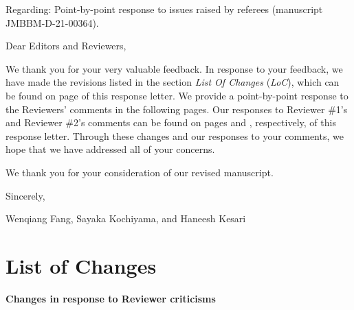 \documentclass[11pt,letterpaper]{report}
\begin{document}
\newpage
\setcounter{page}{1}
\thispagestyle{fancy}
\phantom{x}
\vspace{4em}

Regarding: Point-by-point response to issues raised by referees  (manuscript JMBBM-D-21-00364).

\vspace{3em}
Dear Editors and Reviewers,
\vspace{1em}

We thank you for your very valuable feedback. In response to your feedback, we have made the revisions listed in the section \textit{List Of Changes} (\textit{LoC}), which can be found on  page \pageref{LoCpage} of this response letter. We  provide a point-by-point response to the Reviewers' comments in the following pages. Our responses to Reviewer \#1's and Reviewer \#2's comments can be found on pages \pageref{rev1} and \pageref{rev2}, respectively, of this response letter. Through these changes and our responses to your comments, we hope that we have addressed all of your concerns.

We thank you for your consideration of our revised manuscript.

\vspace{2em}
Sincerely,

Wenqiang Fang, Sayaka Kochiyama, and Haneesh Kesari

\clearpage
\pagestyle{plain}
\section*{List of Changes}
\label{LoCpage}

{\bf Changes in response to Reviewer criticisms}
\end{document}
